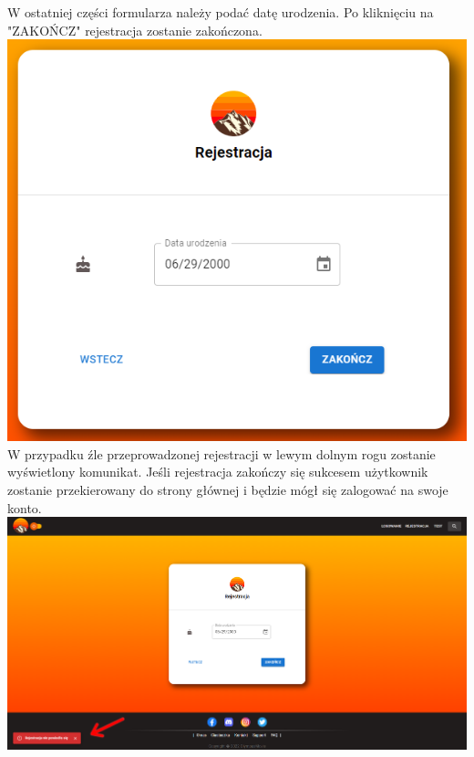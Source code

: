 \documentclass[12pt]{article}
\begin{document}
\begin{flushleft}
\begin{itemize}
			W ostatniej części formularza należy podać datę urodzenia. Po kliknięciu na "ZAKOŃCZ" rejestracja zostanie zakończona.\linebreak
			\includegraphics[scale=0.7]{Rejestracja4.png} \linebreak
			W przypadku źle przeprowadzonej rejestracji w lewym dolnym rogu zostanie wyświetlony komunikat. Jeśli rejestracja zakończy się sukcesem użytkownik zostanie przekierowany do strony głównej i będzie mógł się zalogować na swoje konto.\linebreak
			\includegraphics[scale=0.3]{RejestracjaNieudana.png} \linebreak
			


\end{itemize}
\end{flushleft}
\end{document}

